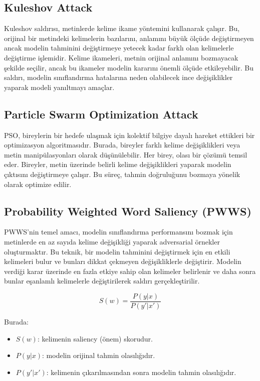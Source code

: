 \newpage

\subsection{Kuleshov Attack}

Kuleshov saldırısı, metinlerde kelime ikame yöntemini kullanarak çalışır. Bu, orijinal bir metindeki kelimelerin bazılarını, anlamını büyük ölçüde değiştirmeyen ancak modelin tahminini değiştirmeye yetecek kadar farklı olan kelimelerle değiştirme işlemidir. Kelime ikameleri, metnin orijinal anlamını bozmayacak şekilde seçilir, ancak bu ikameler modelin kararını önemli ölçüde etkileyebilir. Bu saldırı, modelin sınıflandırma hatalarına neden olabilecek ince değişiklikler yaparak modeli yanıltmayı amaçlar. 

\newpage

\subsection{Particle Swarm Optimization Attack}

PSO, bireylerin bir hedefe ulaşmak için kolektif bilgiye dayalı hareket ettikleri bir optimizasyon algoritmasıdır. Burada, bireyler farklı kelime değişiklikleri veya metin manipülasyonları olarak düşünülebilir. Her birey, olası bir çözümü temsil eder. Bireyler, metin üzerinde belirli kelime değişiklikleri yaparak modelin çıktısını değiştirmeye çalışır. Bu süreç, tahmin doğruluğunu bozmaya yönelik olarak optimize edilir.

\newpage

\subsection{Probability Weighted Word Saliency (PWWS)}

PWWS'nin temel amacı, modelin sınıflandırma performansını bozmak için metinlerde en az sayıda kelime değişikliği yaparak adversarial örnekler oluşturmaktır. Bu teknik, bir modelin tahminini değiştirmek için en etkili kelimeleri bulur ve bunları dikkat çekmeyen değişikliklerle değiştirir. Modelin verdiği karar üzerinde en fazla etkiye sahip olan kelimeler belirlenir ve daha sonra bunlar eşanlamlı kelimelerle değiştirilerek saldırı gerçekleştirilir.

\[ S(w) = \frac{P(y|x)}{P(y'|x')} \]

Burada:

\begin{itemize}
    \item $S(w)$: kelimenin saliency (önem) skorudur.
    \item $P(y|x)$: modelin orijinal tahmin olasılığıdır.
    \item $P(y'|x')$: kelimenin çıkarılmasından sonra modelin tahmin olasılığıdır.
\end{itemize}

